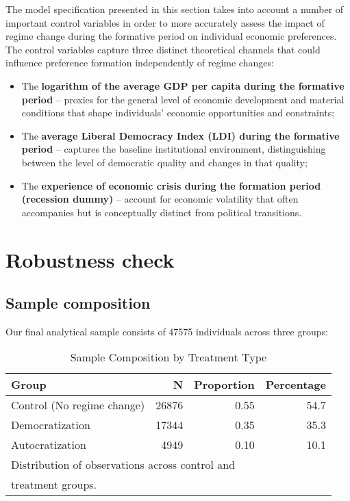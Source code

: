 \documentclass[
  letterpaper,
  DIV=11,
  numbers=noendperiod]{scrartcl}
\begin{document}
The model specification presented in this section takes into account a
number of important control variables in order to more accurately assess
the impact of regime change during the formative period on individual
economic preferences. The control variables capture three distinct
theoretical channels that could influence preference formation
independently of regime changes:

\begin{itemize}
\item
  The \textbf{logarithm of the average GDP per capita during the
  formative period} -- proxies for the general level of economic
  development and material conditions that shape individuals' economic
  opportunities and constraints;
\item
  The \textbf{average Liberal Democracy Index (LDI) during the formative
  period} -- captures the baseline institutional environment,
  distinguishing between the level of democratic quality and changes in
  that quality;
\item
  The \textbf{experience of economic crisis during the formation period
  (recession dummy)} -- account for economic volatility that often
  accompanies but is conceptually distinct from political transitions.
\end{itemize}

\hypertarget{robustness-check}{%
\section{Robustness check}\label{robustness-check}}

\hypertarget{sample-composition}{%
\subsection{Sample composition}\label{sample-composition}}

Our final analytical sample consists of 47575 individuals across three
groups:

\hypertarget{tbl-samplecomp}{}
\begin{table}
\caption{\label{tbl-samplecomp}Sample Composition by Treatment Type }\tabularnewline

\centering
\begin{tabular}{l|r|r|r}
\hline
Group & N & Proportion & Percentage\\
\hline
Control (No regime change) & 26876 & 0.55 & 54.7\\
\hline
Democratization & 17344 & 0.35 & 35.3\\
\hline
Autocratization & 4949 & 0.10 & 10.1\\
\hline
\multicolumn{4}{l}{\textsuperscript{} Distribution of observations across control and}\\
\multicolumn{4}{l}{treatment groups.}\\
\end{tabular}
\end{table}
\end{document}
